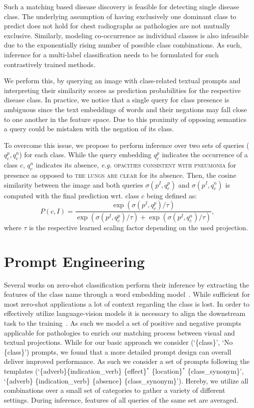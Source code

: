 \documentclass[runningheads]{llncs}
\begin{document}
Such a matching based disease discovery is feasible for detecting single disease class. The underlying assumption of having exclusively one dominant class to predict does not hold for chest radiographs as pathologies are not mutually exclusive. Similarly, modeling co-occurrence as individual classes is also infeasible due to the exponentially rising number of possible class combinations. As such, inference for a multi-label classification needs to be formulated for such contrastively trained methods.

We perform this, by querying an image with class-related textual prompts and interpreting their similarity scores as prediction probabilities for the respective disease class. In practice, we notice that a single query for class presence is ambiguous since the text embeddings of words and their negations may fall close to one another in the feature space. Due to this proximity of opposing semantics a query could be mistaken with the negation of its class. 

To overcome this issue, we propose to perform inference over two sets of queries ($q_c^p,q_c^n$) for each class. While the query embedding $q_c^p$  indicates the occurrence of a class $c$, $q_c^n$ indicates its absence, \textit{e.g.} \textsc{opacities consistent with pneumonia} for presence as opposed to \textsc{the lungs are clear} for its absence.
Then, the cosine similarity between the image and both queries $\sigma(p^I,q_c^p)$ and $\sigma(p^I,q_c^n)$ is computed with the final prediction wrt. class $c$ being defined as:
\begin{equation}
    P(c,I) = \frac{\exp(\sigma(p^I,q_c^p)/\tau)}{\exp(\sigma(p^I,q_c^p)/\tau) + \exp(\sigma(p^I,q_c^n)/\tau)},
\end{equation}
where $\tau$ is the respective learned scaling factor depending on the used projection.

\section{Prompt Engineering}
Several works on zero-shot classification perform their inference by extracting the features of the class name through a word embedding model~\cite{wang2019survey}. While sufficient for most zero-shot applications a lot of context regarding the class is lost.  In order to effectively utilize language-vision models it is necessary to align the downstream task to the training~\cite{radford2021learning}. 
As such we model a set of positive and negative prompts applicable for pathologies to enrich our matching process between visual and textual projections.
While for our basic approach we consider (`\{class\}', `No \{class\}') prompts, we found that a more detailed prompt design can overall deliver improved performance.  As such we consider a set of prompts following the templates (`\{adverb\}\{indication\_verb\} \{effect\}$^*$ \{location\}$^*$ \{class\_synonym\}', `\{adverb\} \{indication\_verb\} \{absence\} \{class\_synonym\}'). Hereby, we utilize all combinations over a small set of categories to gather a variety of different settings. During inference, features of all queries of the same set are averaged.  
\end{document}
